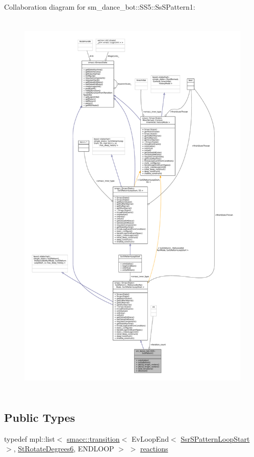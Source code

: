 Collaboration diagram for sm\+\_\+dance\+\_\+bot\+:\+:S\+S5\+:\+:Ss\+S\+Pattern1\+:
\nopagebreak
\begin{figure}[H]
\begin{center}
\leavevmode
\includegraphics[height=550pt]{structsm__dance__bot_1_1SS5_1_1SsSPattern1__coll__graph}
\end{center}
\end{figure}
\subsection*{Public Types}
\begin{DoxyCompactItemize}
\item 
typedef mpl\+::list$<$ \hyperlink{classsmacc_1_1transition}{smacc\+::transition}$<$ Ev\+Loop\+End$<$ \hyperlink{structSsrSPatternLoopStart}{Ssr\+S\+Pattern\+Loop\+Start} $>$, \hyperlink{structsm__dance__bot_1_1StRotateDegrees6}{St\+Rotate\+Degrees6}, E\+N\+D\+L\+O\+OP $>$ $>$ \hyperlink{structsm__dance__bot_1_1SS5_1_1SsSPattern1_ac94d5cb018ec91bdb102b9dd8cd1d20d}{reactions}
\end{DoxyCompactItemize}
